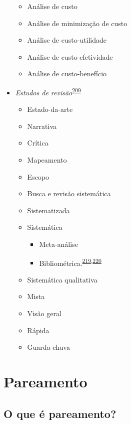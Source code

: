 \documentclass[
  a4paper,
]{book}
\begin{document}
\begin{itemize}
  \begin{itemize}
  \item
    Análise de custo
  \item
    Análise de minimização de custo
  \item
    Análise de custo-utilidade
  \item
    Análise de custo-efetividade
  \item
    Análise de custo-benefício
  \end{itemize}
\item
  \emph{Estudos de revisão}\textsuperscript{\protect\hyperlink{ref-Grant2009}{209}}

  \begin{itemize}
  \item
    Estado-da-arte
  \item
    Narrativa
  \item
    Crítica
  \item
    Mapeamento
  \item
    Escopo
  \item
    Busca e revisão sistemática
  \item
    Sistematizada
  \item
    Sistemática

    \begin{itemize}
    \item
      Meta-análise
    \item
      Bibliométrica.\textsuperscript{\protect\hyperlink{ref-donthu2021}{219},\protect\hyperlink{ref-lim2023}{220}}
    \end{itemize}
  \item
    Sistemática qualitativa
  \item
    Mista
  \item
    Visão geral
  \item
    Rápida
  \item
    Guarda-chuva
  \end{itemize}
\end{itemize}

\hypertarget{pareamento}{%
\section{Pareamento}\label{pareamento}}

\hypertarget{o-que-uxe9-pareamento}{%
\subsection{O que é pareamento?}\label{o-que-uxe9-pareamento}}
\end{document}
